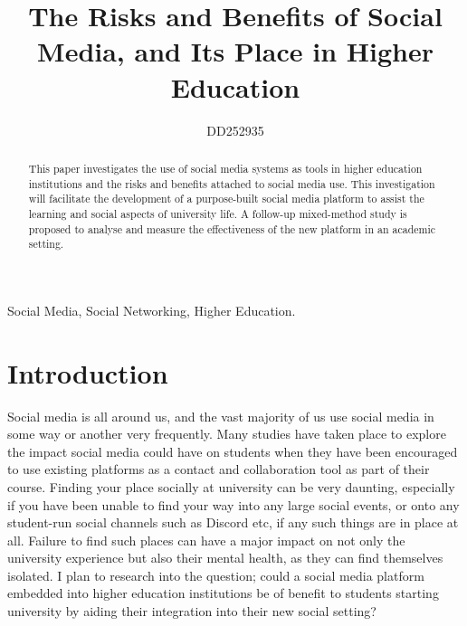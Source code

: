 \documentclass[lettersize,journal]{IEEEtran}
\begin{document}
\title{The Risks and Benefits of Social Media, and Its Place in Higher Education}

\author{DD252935}




\maketitle

\begin{abstract}
        This paper investigates the use of social media systems as tools in higher education
        institutions and the risks and benefits attached to social media use. This investigation will
        facilitate the development of a purpose-built social media platform to assist the learning and social
        aspects of university life. A follow-up mixed-method study is proposed to analyse and measure the effectiveness of
        the new platform in an academic setting.
\end{abstract}





\begin{IEEEkeywords}
Social Media, Social Networking, Higher Education.
\end{IEEEkeywords}

\section{Introduction}
        Social media is all around us, and the vast majority of us use social media in some way or another very
        frequently. Many studies have taken place to explore the impact social media could have on students
        when they have been encouraged to use existing platforms as a contact and collaboration tool as part
        of their course.
    Finding your place socially at university can be very daunting, especially if you have been unable to find
    your way into any large social events, or onto any student-run social channels such as Discord \cite{Discord} etc, if any
    such things are in place at all. Failure to find such places can have a major impact on not only the university
    experience but also their mental health, as they can find themselves isolated. I plan to research into the
    question; could a social media platform embedded into higher education institutions be of benefit to students
    starting university by aiding their integration into their new social setting?
\end{document}
